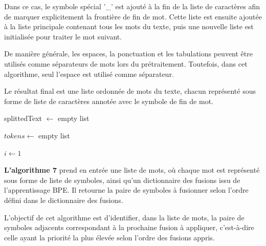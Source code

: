 \documentclass[12pt,a4paper]{report}
\begin{document}
Dans ce cas, le symbole spécial '\_' est ajouté à la fin de la liste de caractères afin de marquer explicitement la frontière de fin de mot. Cette liste est ensuite ajoutée à la liste principale contenant tous les mots du texte, puis une nouvelle liste est initialisée pour traiter le mot suivant.

De manière générale, les espaces, la ponctuation et les tabulations peuvent être utilisés comme séparateurs de mots lors du prétraitement. Toutefois, dans cet algorithme, seul l’espace est utilisé comme séparateur.

Le résultat final est une liste ordonnée de mots du texte, chacun représenté sous forme de liste de caractères annotée avec le symbole de fin de mot.

\begin{algorithm}[H]
	\caption{Split}
	
	splittedText $\leftarrow$ empty list\;
	
	$tokens \leftarrow$ empty list\;
	
	$i \leftarrow 1$\;
	
	
	
\end{algorithm}

\vspace{0.5 cm}

\textbf{L’algorithme 7} prend en entrée une liste de mots, où chaque mot est représenté sous forme de liste de symboles, ainsi qu’un dictionnaire des fusions issu de l’apprentissage BPE. Il retourne la paire de symboles à fusionner selon l’ordre défini dans le dictionnaire des fusions.

L’objectif de cet algorithme est d’identifier, dans la liste de mots, la paire de symboles adjacents correspondant à la prochaine fusion à appliquer, c’est-à-dire celle ayant la priorité la plus élevée selon l’ordre des fusions appris.
\end{document}
